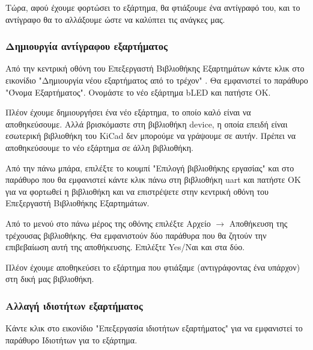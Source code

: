 \documentclass[a4paper]{article}
\begin{document}
Τώρα, αφού έχουμε φορτώσει το εξάρτημα, θα φτιάξουμε ένα αντίγραφό του, και το αντίγραφο θα το αλλάξουμε ώστε να καλύπτει τις ανάγκες μας.

\subsubsection{Δημιουργία αντίγραφου εξαρτήματος}

Από την κεντρική οθόνη του Επεξεργαστή Βιβλιοθήκης Εξαρτημάτων κάντε κλικ στο εικονίδιο "Δημιουργία νέου εξαρτήματος από το τρέχον" %
. Θα εμφανιστεί το παράθυρο "Όνομα Εξαρτήματος". Ονομάστε το νέο εξάρτημα b\textenglish{LED} και πατήστε ΟΚ.

\begin{figure}
  \begin{center}
    \label{fig:kicad-main}
  \end{center}
\end{figure}

Πλέον έχουμε δημιουργήσει ένα νέο εξάρτημα, το οποίο καλό είναι να αποθηκεύσουμε. Αλλά βρισκόμαστε στη βιβλιοθήκη device, η οποία επειδή είναι εσωτερική βιβλιοθήκη του \textenglish{KiCad} δεν μπορούμε να γράψουμε σε αυτήν. Πρέπει να αποθηκεύσουμε το νέο εξάρτημα σε άλλη βιβλιοθήκη.

Από την πάνω μπάρα, επιλέξτε το κουμπί "Επιλογή βιβλιοθήκης εργασίας" %
 και στο παράθυρο που θα εμφανιστεί κάντε κλικ πάνω στη βιβλιοθήκη uart και πατήστε ΟΚ για να φορτωθεί η βιβλιοθήκη και να επιστρέψετε στην κεντρική οθόνη του Επεξεργαστή Βιβλιοθήκης Εξαρτημάτων.

Από το μενού στο πάνω μέρος της οθόνης επιλέξτε Αρχείο $\rightarrow$ Αποθήκευση της τρέχουσας βιβλιοθήκης. Θα εμφανιστούν δύο παράθυρα που θα ζητούν την επιβεβαίωση αυτή της αποθήκευσης. Επιλέξτε Yes/Ναι και στα δύο.

Πλέον έχουμε αποθηκεύσει το εξάρτημα που φτιάξαμε (αντιγράφοντας ένα υπάρχον) στη δική μας βιβλιοθήκη.

\subsubsection{Αλλαγή ιδιοτήτων εξαρτήματος}
Κάντε κλικ στο εικονίδιο "Επεξεργασία ιδιοτήτων εξαρτήματος" %
για να εμφανιστεί το παράθυρο Ιδιοτήτων για το εξάρτημα. 

\begin{figure}
  \begin{center}
    \label{fig:kicad-main}
  \end{center}
\end{figure}
\end{document}
